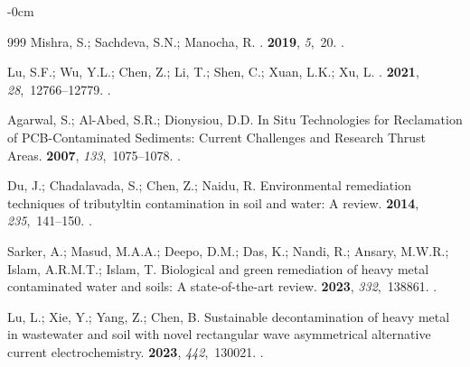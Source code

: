 \documentclass[algorithms,article,accept,pdftex,moreauthors]{Definitions/mdpi}
\begin{document}
\begin{adjustwidth}{-\extralength}{0cm}
\begin{thebibliography}{999}
Mishra, S.; Sachdeva, S.N.; Manocha, R.
.
  {\bf 2019}, {\em 5},~20.
.

Lu, S.F.; Wu, Y.L.; Chen, Z.; Li, T.; Shen, C.; Xuan, L.K.; Xu, L.
.
 {\bf 2021}, {\em
  28},~12766--12779.
.

Agarwal, S.; Al-Abed, S.R.; Dionysiou, D.D.
\newblock In Situ Technologies for Reclamation of PCB-Contaminated Sediments:
  Current Challenges and Research Thrust Areas.
 {\bf 2007}, {\em
  133},~1075--1078.
.

Du, J.; Chadalavada, S.; Chen, Z.; Naidu, R.
\newblock Environmental remediation techniques of tributyltin contamination in
  soil and water: A review.
 {\bf 2014}, {\em 235},~141--150.
.

Sarker, A.; Masud, M.A.A.; Deepo, D.M.; Das, K.; Nandi, R.; Ansary, M.W.R.;
  Islam, A.R.M.T.; Islam, T.
\newblock Biological and green remediation of heavy metal contaminated water
  and soils: A state-of-the-art review.
 {\bf 2023}, {\em 332},~138861.
.

\clearpage 
{}
Lu, L.; Xie, Y.; Yang, Z.; Chen, B.
\newblock Sustainable decontamination of heavy metal in wastewater and soil
  with novel rectangular wave asymmetrical alternative current
  electrochemistry.
 {\bf 2023}, {\em 442},~130021.
.


\end{thebibliography}
\end{adjustwidth}
\end{document}
